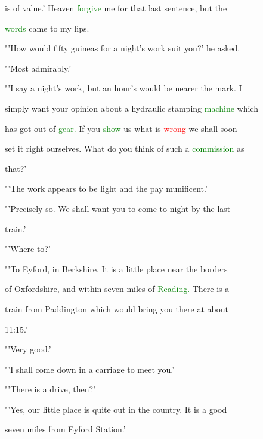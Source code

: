  is of value.' Heaven \textcolor{green}{forgive} me for that last \textcolor{BurntOrange}{sentence,} but the

 \textcolor{green}{words} came to my lips.



 "'How would fifty guineas for a night's work suit you?' he asked.



 "'Most admirably.'



 "'I say a night's work, but an hour's would be nearer the mark. I

 simply want your opinion about a hydraulic stamping \textcolor{green}{machine} which

 has got out of \textcolor{green}{gear.} If you \textcolor{green}{show} us what is \textcolor{red}{wrong} we shall soon

 set it right ourselves. What do you think of such a \textcolor{green}{commission} as

 that?'



 "'The work appears to be light and the \textcolor{BurntOrange}{pay} munificent.'



 "'Precisely so. We shall want you to come to-night by the last

 train.'



 "'Where to?'



 "'To Eyford, in Berkshire. It is a little place near the borders

 of Oxfordshire, and within seven miles of \textcolor{green}{Reading.} There is a

 train from Paddington which would bring you there at about

 11:15.'



 "'Very \textcolor{BurntOrange}{good.'}



 "'I shall come down in a carriage to meet you.'



 "'There is a drive, then?'



 "'Yes, our little place is quite out in the country. It is a \textcolor{BurntOrange}{good}

 seven miles from Eyford Station.'



